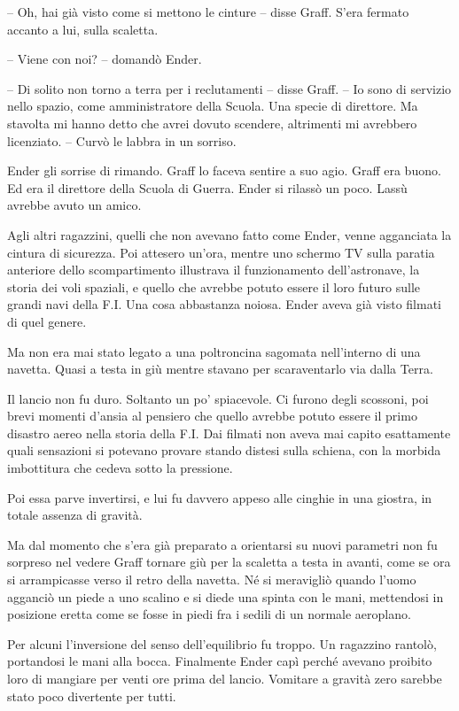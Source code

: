 {-- Oh, hai già visto come si mettono le cinture -- disse Graff. S'era
	fermato accanto a lui, sulla scaletta.}

{-- Viene con noi? -- domandò Ender.}

{-- Di solito non torno a terra per i reclutamenti -- disse Graff. -- Io
	sono di servizio nello spazio, come amministratore della Scuola. Una
	specie di direttore. Ma stavolta mi hanno detto che avrei dovuto
	scendere, altrimenti mi avrebbero licenziato. -- Curvò le labbra in un
	sorriso.}

{Ender gli sorrise di rimando. Graff lo faceva sentire a suo agio. Graff
	era buono. Ed era il direttore della Scuola di Guerra. Ender si rilassò
	un poco. Lassù avrebbe avuto un amico.}

{Agli altri ragazzini, quelli che non avevano fatto come Ender, venne
	agganciata la cintura di sicurezza. Poi attesero un'ora, mentre uno
	schermo TV sulla paratia anteriore dello scompartimento illustrava il
	funzionamento dell'astronave, la storia dei voli spaziali, e quello che
	avrebbe potuto essere il loro futuro sulle grandi navi della F.I. Una
	cosa abbastanza noiosa. Ender aveva già visto filmati di quel genere.}

{Ma non era mai stato legato a una poltroncina sagomata nell'interno di
	una navetta. Quasi a testa in giù mentre stavano per scaraventarlo via
	dalla Terra.}

{Il lancio non fu duro. Soltanto un po' spiacevole. Ci furono degli
	scossoni, poi brevi momenti d'ansia al pensiero che quello avrebbe
	potuto essere il primo disastro aereo nella storia della F.I. Dai
	filmati non aveva mai capito esattamente quali sensazioni si potevano
	provare stando distesi sulla schiena, con la morbida imbottitura che
	cedeva sotto la pressione.}

{Poi essa parve invertirsi, e lui fu davvero appeso alle cinghie in una
	giostra, in totale assenza di gravità.}

{Ma dal momento che s'era già preparato a orientarsi su nuovi parametri
	non fu sorpreso nel vedere Graff tornare giù per la scaletta a testa in
	avanti, come se ora si arrampicasse verso il retro della navetta. Né si
	meravigliò quando l'uomo agganciò un piede a uno scalino e si diede una
	spinta con le mani, mettendosi in posizione eretta come se fosse in
	piedi fra i sedili di un normale aeroplano.}

{Per alcuni l'inversione del senso dell'equilibrio fu troppo. Un
	ragazzino rantolò, portandosi le mani alla bocca. Finalmente Ender capì
	perché avevano proibito loro di mangiare per venti ore prima del lancio.
	Vomitare a gravità zero sarebbe stato poco divertente per tutti.}

